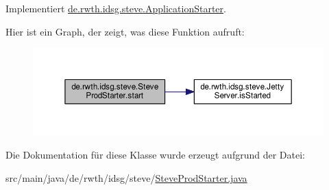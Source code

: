 Implementiert \hyperlink{interfacede_1_1rwth_1_1idsg_1_1steve_1_1_application_starter_ad6461bffb2faebb821cadba517773b77}{de.\-rwth.\-idsg.\-steve.\-Application\-Starter}.



Hier ist ein Graph, der zeigt, was diese Funktion aufruft\-:\nopagebreak
\begin{figure}[H]
\begin{center}
\leavevmode
\includegraphics[width=350pt]{classde_1_1rwth_1_1idsg_1_1steve_1_1_steve_prod_starter_a406f74ba90a2381896db989b907cc947_cgraph}
\end{center}
\end{figure}




Die Dokumentation für diese Klasse wurde erzeugt aufgrund der Datei\-:\begin{DoxyCompactItemize}
\item 
src/main/java/de/rwth/idsg/steve/\hyperlink{_steve_prod_starter_8java}{Steve\-Prod\-Starter.\-java}\end{DoxyCompactItemize}
